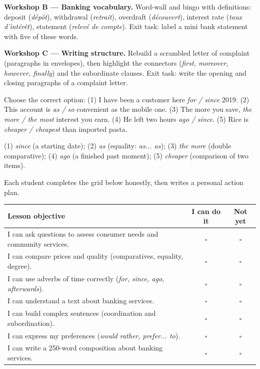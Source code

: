 \documentclass[11pt]{article}
\newcommand{\cle}[1]{{\popxbold\color{popdark}#1}}
\newcounter{popsec}
\newcounter{popsub}
\newcommand{\courssub}[1]{%
  \stepcounter{popsub}%
  \par\vspace{9pt}\noindent{\popxbold\fontsize{11.5}{13}\selectfont\color{popink}{\color{poporange}\thepopsec.\thepopsub}\hspace{6pt}#1}\par\nopagebreak\vspace{4pt}
}
\begin{document}
\textbf{Workshop B — Banking vocabulary.} Word-wall and bingo with definitions: \cle{deposit} (\emph{dépôt}), \cle{withdrawal} (\emph{retrait}), \cle{overdraft} (\emph{découvert}), \cle{interest rate} (\emph{taux d'intérêt}), \cle{statement} (\emph{relevé de compte}). Exit task: label a mini bank statement with five of these words.

\textbf{Workshop C — Writing structure.} Rebuild a scrambled letter of complaint (paragraphs in envelopes), then highlight the connectors (\emph{first, moreover, however, finally}) and the subordinate clauses. Exit task: write the opening and closing paragraphs of a complaint letter.

\begin{exercice}
Choose the correct option: (1) I have been a customer here \emph{for / since} 2019. (2) This account is \emph{as / so} convenient as the mobile one. (3) The more you save, \emph{the more / the most} interest you earn. (4) He left two hours \emph{ago / since}. (5) Rice is \emph{cheaper / cheapest} than imported pasta.
\end{exercice}

\begin{corrige}
(1) \emph{since} (a starting date); (2) \emph{as} (equality: \emph{as... as}); (3) \emph{the more} (double comparative); (4) \emph{ago} (a finished past moment); (5) \emph{cheaper} (comparison of two items).
\end{corrige}

\courssub{Student Self-Assessment}

Each student completes the grid below honestly, then writes a personal action plan.

\begin{center}
\begin{tabularx}{\linewidth}{|X|c|c|}
\hline
\rowcolor{popblueL} \textbf{Lesson objective} & \textbf{I can do it} & \textbf{Not yet} \\
\hline
I can ask questions to assess consumer needs and community services. & $\square$ & $\square$ \\
\hline
I can compare prices and quality (comparatives, equality, degree). & $\square$ & $\square$ \\
\hline
I can use adverbs of time correctly (\emph{for, since, ago, afterwards}). & $\square$ & $\square$ \\
\hline
I can understand a text about banking services. & $\square$ & $\square$ \\
\hline
I can build complex sentences (coordination and subordination). & $\square$ & $\square$ \\
\hline
I can express my preferences (\emph{would rather, prefer... to}). & $\square$ & $\square$ \\
\hline
I can write a 250-word composition about banking services. & $\square$ & $\square$ \\
\hline
\end{tabularx}
\end{center}
\end{document}
